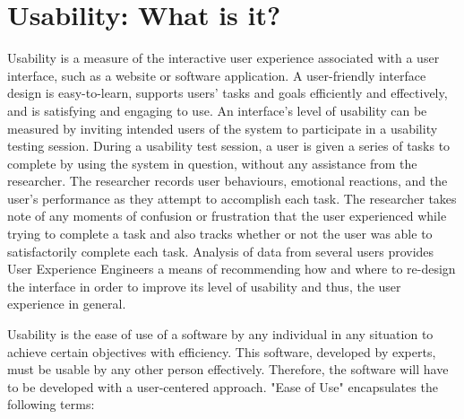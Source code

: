\section{Usability: What is it?}

Usability is a measure of the interactive user experience associated with a user interface, such as a website or software application. A user-friendly interface design is easy-to-learn, supports users' tasks and goals efficiently and effectively, and is satisfying and engaging to use.
\newline
An interface's level of usability can be measured by inviting intended users of the system to participate in a usability testing session. During a usability test session, a user is given a series of tasks to complete by using the system in question, without any assistance from the researcher. The researcher records user behaviours, emotional reactions, and the user's performance as they attempt to accomplish each task. The researcher takes note of any moments of confusion or frustration that the user experienced while trying to complete a task and also tracks whether or not the user was able to satisfactorily complete each task. Analysis of data from several users provides User Experience Engineers a means of recommending how and where to re-design the interface in order to improve its level of usability and thus, the user experience in general.

\smallskip

Usability is the ease of use of a software by any individual in any situation to achieve certain objectives with efficiency. This software, developed by experts, must be usable by any other person effectively. Therefore, the software will have to be developed with a user-centered approach. "Ease of Use" encapsulates the following terms:


